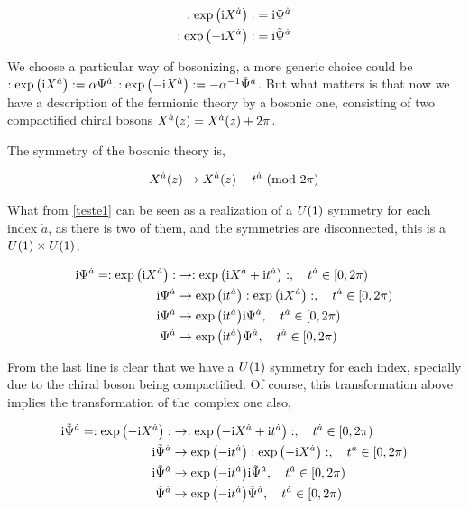 \begin{subequations}\label{teste1}
\begin{align}
    :\exp\qty(\textnormal{i} X^{\dot a}):&=\textnormal{i} \Psi^{\dot a}\\
    :\exp\qty(-\textnormal{i} X^{\dot a}):&=\textnormal{i} {\tilde\Psi}^{\dot a}
\end{align}
\end{subequations}

We choose a particular way of bosonizing, a more generic choice could be $:\exp\qty(\textnormal{i} X^{\dot a}):=\alpha \Psi^{\dot a},:\exp\qty(-\textnormal{i} X^{\dot a}):=-\alpha^{-1} {\tilde\Psi}^{\dot a}$. 
But what matters is that now we have a description of the fermionic theory by a bosonic one, consisting of two compactified chiral bosons $X^{\dot a}\qty(z)=X^{\dot a}\qty(z)+2\pi$. 

\probitem{}

The symmetry of the bosonic theory is,

\begin{align*}
    X^{\dot a}\qty(z)\rightarrow X^{\dot a}\qty(z)+t^{\dot a}\ \qty(\textnormal{mod }2\pi)
\end{align*}

What from \ref{teste1} can be seen as a realization of a $U\qty(1)$ symmetry for each index $\dot a$, as there is 
two of them, and the symmetries are disconnected, this is a $U\qty(1)\times U\qty(1)$,

\begin{align*}
    \im\Psi^{\dot a}=\cnord{\exp\qty(\im X^{\dot a})}&\rightarrow\cnord{\exp\qty(\im X^{\dot a}+\im t^{\dot a})},\ \ \ t^{\dot a}\in[0,2\pi)\\
    \im\Psi^{\dot a}&\rightarrow\exp\qty(\im t^{\dot a})\cnord{\exp\qty(\im X^{\dot a})},\ \ \ t^{\dot a}\in[0,2\pi)\\
    \im\Psi^{\dot a}&\rightarrow\exp\qty(\im t^{\dot a})\im\Psi^{\dot a},\ \ \ t^{\dot a}\in[0,2\pi)\\
    \Psi^{\dot a}&\rightarrow\exp\qty(\im t^{\dot a})\Psi^{\dot a},\ \ \ t^{\dot a}\in[0,2\pi)
\end{align*}

From the last line is clear that we have a $U\qty(1)$ symmetry for each index, specially due to the chiral boson being 
compactified. Of course, this transformation above implies the transformation of the complex one also,

\begin{align*}
    \im{\tilde\Psi}^{\dot a}=\cnord{\exp\qty(-\im X^{\dot a})}&\rightarrow\cnord{\exp\qty(-\im X^{\dot a}+\im t^{\dot a})},\ \ \ t^{\dot a}\in[0,2\pi)\\
    \im{\tilde\Psi}^{\dot a}&\rightarrow\exp\qty(-\im t^{\dot a})\cnord{\exp\qty(-\im X^{\dot a})},\ \ \ t^{\dot a}\in[0,2\pi)\\
    \im{\tilde\Psi}^{\dot a}&\rightarrow\exp\qty(-\im t^{\dot a})\im{\tilde\Psi}^{\dot a},\ \ \ t^{\dot a}\in[0,2\pi)\\
    {\tilde\Psi}^{\dot a}&\rightarrow\exp\qty(-\im t^{\dot a}){\tilde\Psi}^{\dot a},\ \ \ t^{\dot a}\in[0,2\pi)
\end{align*}

